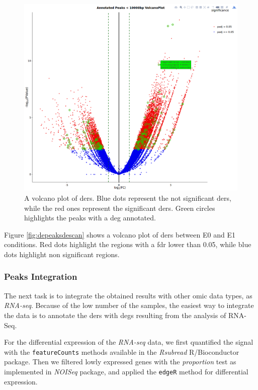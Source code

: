 \begin{figure}[H]
\centering
\includegraphics[width=\textwidth, keepaspectratio]{img/descan2/Annotated_depeaks_degenes.png}
\caption[Annotated Differential Enrichment Regions Volcano]{A volcano plot of \glspl{der}. Blue dots represent the not significant \glspl{der}, while the red ones represent the significant \glspl{der}. Green circles highlights the peaks with a \gls{deg} annotated.}
\label{fig:depeakdegenessdescan}
\centering
\end{figure}

Figure \ref{fig:depeaksdescan} shows a volcano plot of \glspl{der} between E0 and E1 conditions.
Red dots highlight the regions with a \gls{fdr}\cite{Benjamini1995} lower than 0.05, while blue dots highlight non significant regions.

\subsubsection{Peaks Integration}

The next task is to integrate the obtained results with other omic data types, as \textit{RNA-seq}. 
Because of the low number of the samples, the easiest way to integrate the data is to annotate the \glspl{der} with \glspl{deg} resulting from the analysis of RNA-Seq.

For the differential expression of the \textit{RNA-seq} data, we first quantified the signal with the \lstinline!featureCounts! methods available in the \textit{Rsubread} \cite{Liao2013} R/Bioconductor package.
Then we filtered lowly expressed genes with the \textit{proportion} test as implemented in \textit{NOISeq} package, and applied the \lstinline!edgeR! method for differential expression.

